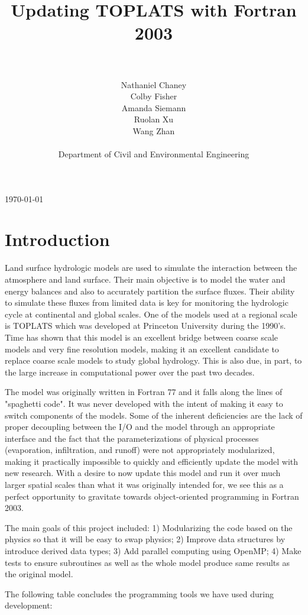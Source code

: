 \documentclass[pdftex,12pt,a4paper]{article}
\title{Updating TOPLATS with Fortran 2003}
\author{\\ \\ Nathaniel Chaney\\ Colby Fisher\\ Amanda Siemann\\ Ruolan Xu\\ Wang Zhan \\ \\ Department of Civil and Environmental Engineering}
\date{}
\begin{document}
\maketitle
\vfill
\begin{center}
{\large \today}
\end{center}

\section{Introduction}
Land surface hydrologic models are used to simulate the interaction between the atmosphere and land surface. Their main objective is to model the water and energy balances and also to accurately partition the surface fluxes. Their ability to simulate these fluxes from limited data is key for monitoring the hydrologic cycle at continental and global scales. One of the models used at a regional scale is TOPLATS which was developed at Princeton University during the 1990's. Time has shown that this model is an excellent bridge between coarse scale models and very fine resolution models, making it an excellent candidate to replace coarse scale models to study global hydrology. This is also due, in part, to the large increase in computational power over the past two decades. 

The model was originally written in Fortran 77 and it falls along the lines of "spaghetti code". It was never developed with the intent of making it easy to switch components of the models. Some of the inherent deficiencies are the lack of proper decoupling between the I/O and the model through an appropriate interface and the fact that the parameterizations of physical processes (evaporation, infiltration, and runoff) were not appropriately modularized, making it practically impossible to quickly and efficiently update the model with new research. With a desire to now update this model and run it over much larger spatial scales than what it was originally intended for, we see this as a perfect opportunity to gravitate towards object-oriented programming in Fortran 2003. 

The main goals of this project included: 1) Modularizing the code based on the physics so that it will be easy to swap physics; 2) Improve data structures by introduce derived data types; 3) Add parallel computing using OpenMP; 4) Make tests to ensure subroutines as well as the whole model produce same results as the original model. 

The following table concludes the programming tools we have used during development:
\end{document}
